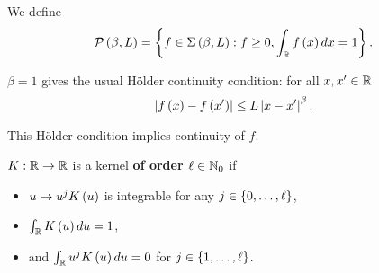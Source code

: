\begin{definition}
  We define
  \begin{equation*}
    \mathcal{P}\left(\beta,L\right) = \left\{f\in\Sigma\left(\beta,L\right): f\geq 0, \int_{\mathbb{R}} f\left(x\right)dx =1\right\}.
  \end{equation*}
\end{definition}
\begin{example}
  $\beta =1$ gives the usual Hölder continuity condition: for all $x,x'\in \mathbb{R}$
  \begin{equation*}
    \left| f\left(x\right)-f\left(x'\right)\right|\leq L\left| x-x'\right|^{\beta}.
  \end{equation*}
\end{example}
{\color{blue}
\begin{remark}
  This Hölder condition implies continuity of $f$.
\end{remark}}
\begin{definition}
  $K:\mathbb{R}\rightarrow \mathbb{R}$ is a kernel \textbf{of order $\ell \in \mathbb{N}_0$} if
  \begin{itemize}
    \item $u\mapsto u^j K\left(u\right)$ is integrable for any $j\in\left\{0,\ldots,\ell\right\}$,
    \item $\int_{\mathbb{R}} K\left(u\right) du =1$,
    \item and $\int_{\mathbb{R}} u^j K\left(u\right) du =0$ for $j\in\left\{1,\ldots, \ell\right\}$.
  \end{itemize}
\end{definition}

